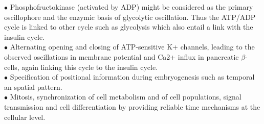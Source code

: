 \documentclass{article}
\begin{document}
$\bullet$ Phosphofructokinase (activated by ADP) might be considered as the primary oscillophore and the enzymic basis of glycolytic oscillation. Thus the ATP/ADP cycle is linked to other cycle such as glycolysis which also entail a link with the insulin cycle.\\

$\bullet$ Alternating opening and closing of ATP-sensitive K+ channels, leading to the observed oscillations in membrane potential and Ca2+ influx in pancreatic $\beta$-cells, again linking this cycle to the insulin cycle.\\

$\bullet$ Specification of positional information during embryogenesis such as temporal an spatial pattern.\\

$\bullet$ Mitosis, synchronization of cell metabolism and of cell populations, signal transmission and cell differentiation by providing reliable time mechanisms at the cellular level.
\end{document}
